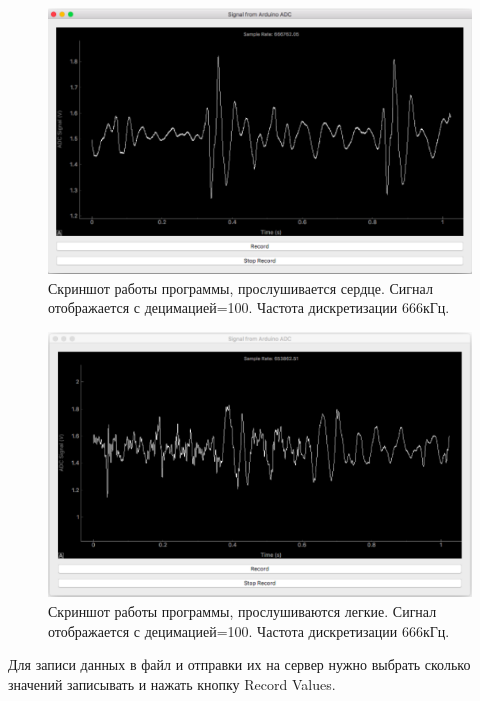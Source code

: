 \documentclass[../paper.tex]{subfiles}
\begin{document}
\begin{figure}[H]
\centering
\includegraphics[width=\textwidth]{images/heart}
\caption{Скриншот работы программы, прослушивается сердце. Сигнал отображается с децимацией=100. Частота дискретизации 666кГц.}
\end{figure}

\begin{figure}[H]
\centering
\includegraphics[width=\textwidth]{images/lungs}
\caption{Скриншот работы программы, прослушиваются легкие. Сигнал отображается с децимацией=100. Частота дискретизации 666кГц.}
\end{figure}

Для записи данных в файл и отправки их на сервер нужно выбрать сколько значений записывать и нажать кнопку Record Values.
\end{document}
